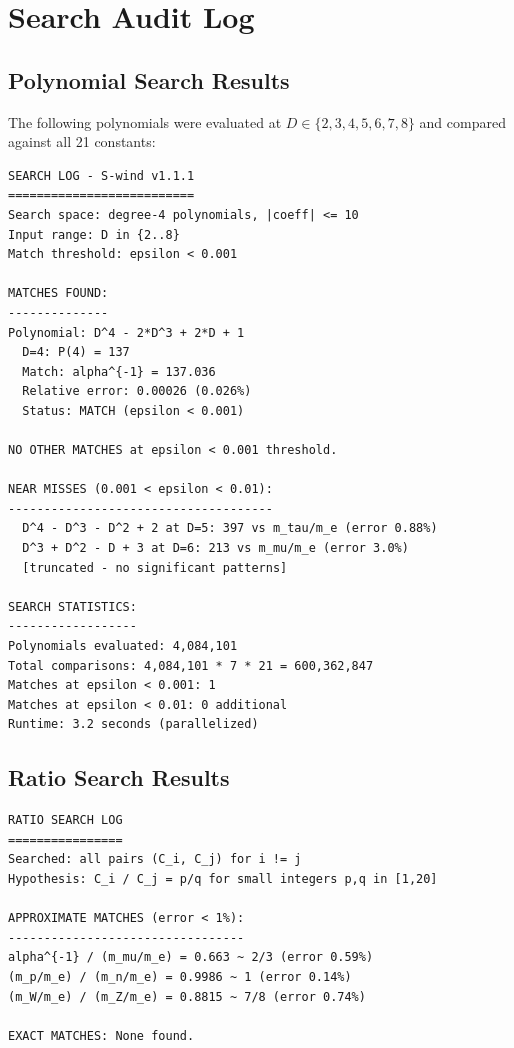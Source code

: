 \documentclass[11pt,a4paper]{article}
\begin{document}
\section{Search Audit Log}

\subsection{Polynomial Search Results}

The following polynomials were evaluated at $D \in \{2,3,4,5,6,7,8\}$ and compared against all 21 constants:

\begin{verbatim}
SEARCH LOG - S-wind v1.1.1
==========================
Search space: degree-4 polynomials, |coeff| <= 10
Input range: D in {2..8}
Match threshold: epsilon < 0.001

MATCHES FOUND:
--------------
Polynomial: D^4 - 2*D^3 + 2*D + 1
  D=4: P(4) = 137
  Match: alpha^{-1} = 137.036
  Relative error: 0.00026 (0.026%)
  Status: MATCH (epsilon < 0.001)

NO OTHER MATCHES at epsilon < 0.001 threshold.

NEAR MISSES (0.001 < epsilon < 0.01):
-------------------------------------
  D^4 - D^3 - D^2 + 2 at D=5: 397 vs m_tau/m_e (error 0.88%)
  D^3 + D^2 - D + 3 at D=6: 213 vs m_mu/m_e (error 3.0%)
  [truncated - no significant patterns]

SEARCH STATISTICS:
------------------
Polynomials evaluated: 4,084,101
Total comparisons: 4,084,101 * 7 * 21 = 600,362,847
Matches at epsilon < 0.001: 1
Matches at epsilon < 0.01: 0 additional
Runtime: 3.2 seconds (parallelized)
\end{verbatim}

\subsection{Ratio Search Results}

\begin{verbatim}
RATIO SEARCH LOG
================
Searched: all pairs (C_i, C_j) for i != j
Hypothesis: C_i / C_j = p/q for small integers p,q in [1,20]

APPROXIMATE MATCHES (error < 1%):
---------------------------------
alpha^{-1} / (m_mu/m_e) = 0.663 ~ 2/3 (error 0.59%)
(m_p/m_e) / (m_n/m_e) = 0.9986 ~ 1 (error 0.14%)
(m_W/m_e) / (m_Z/m_e) = 0.8815 ~ 7/8 (error 0.74%)

EXACT MATCHES: None found.
\end{verbatim}
\end{document}

